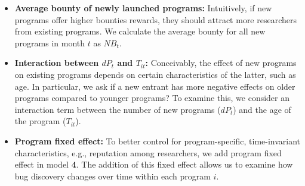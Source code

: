 \begin{itemize}
  \item \textbf{Average bounty of newly launched programs:} Intuitively, if new programs offer higher bounties rewards, they should attract more researchers from existing programs. We calculate the average bounty for all new programs in month $t$ as $NB_t$.
  \item \textbf{Interaction between $dP_t$ and $T_{it}$:} Conceivably, the effect of new programs on existing programs depends on certain characteristics of the latter, such as age. In particular, we ask if a new entrant has more negative effects on older programs compared to younger programs? To examine this, we consider an interaction term between the number of new programs ($dP_t$) and the age of the program ($T_{it}$).
  \item \textbf{Program fixed effect:} To better control for program-specific, time-invariant characteristics, e.g., reputation among researchers, we add program fixed effect in model {\bf 4}. The addition of this fixed effect allows us to examine how bug discovery changes over time within each program $i$.
\end{itemize}

